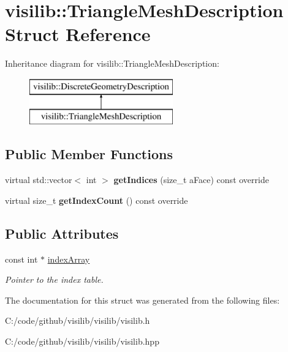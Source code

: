 \hypertarget{structvisilib_1_1_triangle_mesh_description}{}\section{visilib\+::Triangle\+Mesh\+Description Struct Reference}
\label{structvisilib_1_1_triangle_mesh_description}
Inheritance diagram for visilib\+::Triangle\+Mesh\+Description\+:\begin{figure}[H]
\begin{center}
\leavevmode
\includegraphics[height=2.000000cm]{structvisilib_1_1_triangle_mesh_description}
\end{center}
\end{figure}
\subsection*{Public Member Functions}
\begin{DoxyCompactItemize}
\item 
\mbox{\label{structvisilib_1_1_triangle_mesh_description_ad9125f498b0e5eb05001e8706e7393f6}} 
virtual std\+::vector$<$ int $>$ {\bfseries get\+Indices} (size\+\_\+t a\+Face) const override
\item 
\mbox{\label{structvisilib_1_1_triangle_mesh_description_a2ad71fb110d51e86900312b4d2ac5cfd}} 
virtual size\+\_\+t {\bfseries get\+Index\+Count} () const override
\end{DoxyCompactItemize}
\subsection*{Public Attributes}
\begin{DoxyCompactItemize}
\item 
\mbox{\label{structvisilib_1_1_triangle_mesh_description_ad066f88f5351109e3900ae7356da5675}} 
const int $\ast$ \mbox{\hyperlink{structvisilib_1_1_triangle_mesh_description_ad066f88f5351109e3900ae7356da5675}{index\+Array}}
\begin{DoxyCompactList}\small\item\em Pointer to the index table. \end{DoxyCompactList}\end{DoxyCompactItemize}


The documentation for this struct was generated from the following files\+:\begin{DoxyCompactItemize}
\item 
C\+:/code/github/visilib/visilib/visilib.\+h\item 
C\+:/code/github/visilib/visilib/visilib.\+hpp\end{DoxyCompactItemize}
